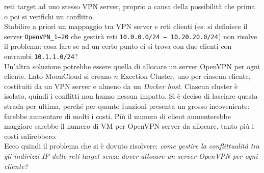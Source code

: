 reti target ad uno stesso VPN server, proprio a causa della possibilità che prima o poi
si verifichi un conflitto.\\
Stabilire a priori un mappaggio tra VPN server e reti clienti (es: si definisce
il server \texttt{OpenVPN\_1--20} che gestirà reti \texttt{10.0.0.0/24 -- 10.20.20.0/24})
non risolve il problema: cosa fare se ad un certo punto ci si trova con due clienti con
entrambi \texttt{10.1.1.0/24}?\\
Un'altra soluzione potrebbe essere quella di allocare un server OpenVPN
per ogni cliente. Lato MoonCloud si creano $n$ Exection Cluster, uno per ciascun cliente,
costituiti da un VPN server e almeno da un \textit{Docker host}. Ciascun cluster è isolato,
quindi i conflitti non hanno nessun impatto. Si è deciso di lasciare questa strada per ultima,
perché per quanto funzioni presenta un grosso incoveniente: farebbe aumentare di molti i
costi. Più il numero di client aumenterebbe maggiore sarebbe il numero di VM per OpenVPN server
da allocare, tanto più i costi salirebbero.\\
Ecco quindi il problema che si è dovuto risolvere: \textit{come gestire
	la conflittualità tra gli indirizzi IP delle reti target senza dover allocare un
server OpenVPN per ogni cliente?}


